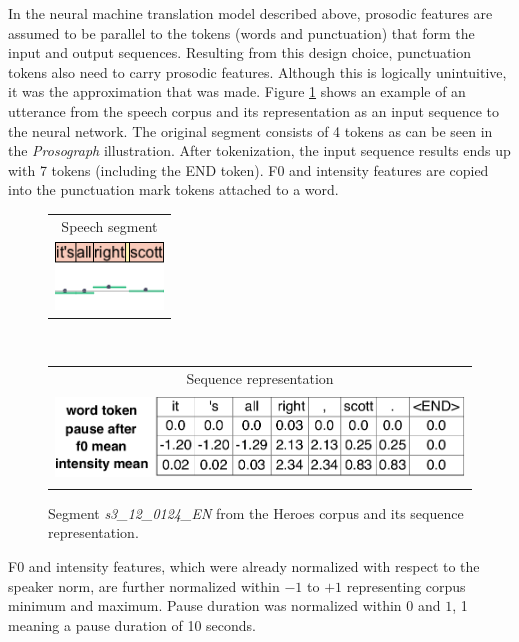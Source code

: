 In the neural machine translation model described above, prosodic features are assumed to be parallel to the tokens (words and punctuation) that form the input and output sequences. Resulting from this design choice, punctuation tokens also need to carry prosodic features. Although this is logically unintuitive, it was the approximation that was made. Figure \ref{transprose:figure:q3:assequence} shows an example of an utterance from the speech corpus and its representation as an input sequence to the neural network. The original segment consists of 4 tokens as can be seen in the \textit{Prosograph} illustration. After tokenization, the input sequence results ends up with 7 tokens (including the END token). F0 and intensity features are copied into the punctuation mark tokens attached to a word.

\begin{figure}[h!]
\centering
\begin{minipage}[t]{0.37\textwidth}
\begin{tabular}{c}
Speech segment \\
\includegraphics[height=1.8cm]{img/s3_12_0124.png} \\
\end{tabular}
\end{minipage}
\\
\begin{minipage}[t]{\textwidth}
\begin{tabular}{c}
Sequence representation \\
\includegraphics[height=2.3cm]{img/s3_12_0124_assequence.pdf} \\
\end{tabular}
\end{minipage}
\caption{Segment \textit{s3\_12\_0124\_EN} from the Heroes corpus and its sequence representation.}
\label{transprose:figure:q3:assequence}%
\end{figure}

F0 and intensity features, which were already normalized with respect to the speaker norm, are further normalized within $-1$ to $+1$ representing corpus minimum and maximum. Pause duration was normalized within $0$ and $1$, 1 meaning a pause duration of 10 seconds. 

